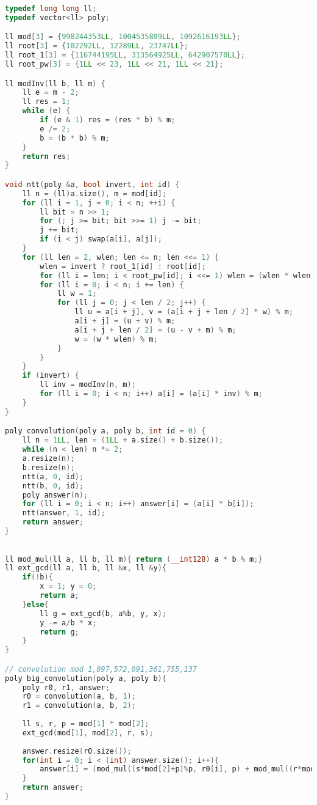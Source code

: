 \documentclass[11pt, a4paper, twoside]{article}
\begin{document}
\begin{lstlisting}[language=C++]
typedef long long ll;
typedef vector<ll> poly;

ll mod[3] = {998244353LL, 1004535809LL, 1092616193LL};
ll root[3] = {102292LL, 12289LL, 23747LL};
ll root_1[3] = {116744195LL, 313564925LL, 642907570LL};
ll root_pw[3] = {1LL << 23, 1LL << 21, 1LL << 21};

ll modInv(ll b, ll m) {
    ll e = m - 2;
    ll res = 1;
    while (e) {
        if (e & 1) res = (res * b) % m;
        e /= 2;
        b = (b * b) % m;
    }
    return res;
}

void ntt(poly &a, bool invert, int id) {
    ll n = (ll)a.size(), m = mod[id];
    for (ll i = 1, j = 0; i < n; ++i) {
        ll bit = n >> 1;
        for (; j >= bit; bit >>= 1) j -= bit;
        j += bit;
        if (i < j) swap(a[i], a[j]);
    }
    for (ll len = 2, wlen; len <= n; len <<= 1) {
        wlen = invert ? root_1[id] : root[id];
        for (ll i = len; i < root_pw[id]; i <<= 1) wlen = (wlen * wlen) % m;
        for (ll i = 0; i < n; i += len) {
            ll w = 1;
            for (ll j = 0; j < len / 2; j++) {
                ll u = a[i + j], v = (a[i + j + len / 2] * w) % m;
                a[i + j] = (u + v) % m;
                a[i + j + len / 2] = (u - v + m) % m;
                w = (w * wlen) % m;
            }
        }
    }
    if (invert) {
        ll inv = modInv(n, m);
        for (ll i = 0; i < n; i++) a[i] = (a[i] * inv) % m;
    }
}

poly convolution(poly a, poly b, int id = 0) {
    ll n = 1LL, len = (1LL + a.size() + b.size());
    while (n < len) n *= 2;
    a.resize(n);
    b.resize(n);
    ntt(a, 0, id);
    ntt(b, 0, id);
    poly answer(n);
    for (ll i = 0; i < n; i++) answer[i] = (a[i] * b[i]);
    ntt(answer, 1, id);
    return answer;
}
\end{lstlisting}

\begin{lstlisting}[language=C++]

ll mod_mul(ll a, ll b, ll m){ return (__int128) a * b % m;}
ll ext_gcd(ll a, ll b, ll &x, ll &y){
    if(!b){
        x = 1; y = 0;
        return a;
    }else{
        ll g = ext_gcd(b, a%b, y, x);
        y -= a/b * x;
        return g;
    }
}

// convolution mod 1,097,572,091,361,755,137
poly big_convolution(poly a, poly b){
    poly r0, r1, answer;
    r0 = convolution(a, b, 1);
    r1 = convolution(a, b, 2);
    
    ll s, r, p = mod[1] * mod[2];
    ext_gcd(mod[1], mod[2], r, s);
    
    answer.resize(r0.size());
    for(int i = 0; i < (int) answer.size(); i++){
        answer[i] = (mod_mul((s*mod[2]+p)%p, r0[i], p) + mod_mul((r*mod[1]+p)%p, r1[i], p) + p) % p;
    }
    return answer;
}
\end{lstlisting}
\end{document}
